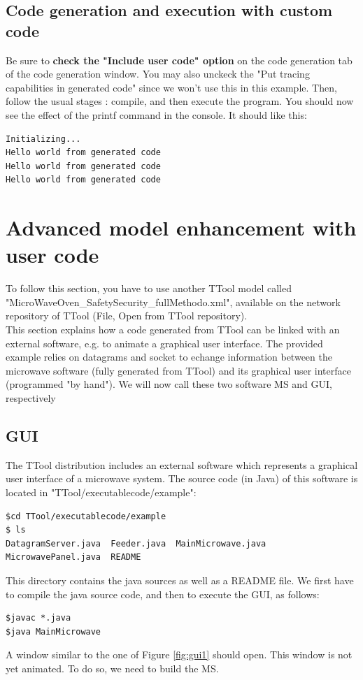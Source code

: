\documentclass[12pt]{article}
\begin{document}
\subsection{Code generation and execution with custom code}
Be sure to \textbf{check the "Include user code" option} on the code generation tab of the code generation window. You may also unckeck the "Put tracing capabilities in generated code" since we won't use this in this example. Then, follow the usual stages : compile, and then execute the program. You should now see the effect of the printf command in the console. It should like this:
\begin{lstlisting}
Initializing...
Hello world from generated code
Hello world from generated code
Hello world from generated code
\end{lstlisting}

\newpage
\section{Advanced model enhancement with user code}\label{sec:advanced}
To follow this section, you have to use another TTool model called "MicroWaveOven\_SafetySecurity\_fullMethodo.xml", available on the network repository of TTool (File, Open from TTool repository).\\
This section explains how a code generated from TTool can be linked with an external software, e.g. to animate a graphical user interface. The provided example relies on datagrams and socket to echange information between the microwave software (fully generated from TTool) and its graphical user interface (programmed "by hand"). We will now call these two software MS and GUI, respectively

\subsection{GUI}
The TTool distribution includes an external software which represents a graphical user interface of a microwave system. The source code (in Java) of this software is located in "TTool/executablecode/example":
\begin{lstlisting}
$cd TTool/executablecode/example
$ ls
DatagramServer.java  Feeder.java  MainMicrowave.java  MicrowavePanel.java  README
\end{lstlisting}
This directory contains the java sources as well as a README file. We first have to compile the java source code, and then to execute the GUI, as follows:
\begin{lstlisting}
$javac *.java
$java MainMicrowave
\end{lstlisting}
A window similar to the one of Figure \ref{fig:gui1} should open. This window is not yet animated. To do so, we need to build the MS.
\end{document}
